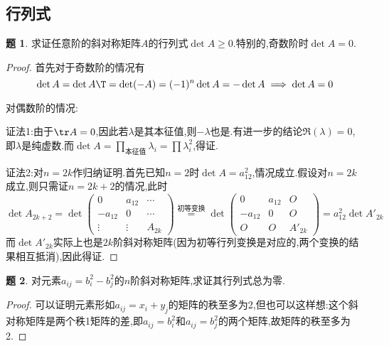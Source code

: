 \documentclass{article}
\theoremstyle{definition}
\newtheorem{exercise}{题}[section]
\begin{document}
\subsection{行列式}
\begin{exercise}
    求证任意阶的斜对称矩阵$A$的行列式$\det A\geq 0$.特别的,奇数阶时$\det A=0$.
\end{exercise}
\begin{proof}
    首先对于奇数阶的情况有$$\det A=\det A\T=\det(-A)=(-1)^n \det A=-\det A\implies \det A=0$$

    对偶数阶的情况:

    证法1:由于$\tr A=0$,因此若$\lambda$是其本征值,则$-\lambda$也是.有进一步的结论$\Re(\lambda)=0$,即$\lambda$是纯虚数.而$\det A=\prod_{\text{本征值}}\lambda_i=\prod \lambda_i^2$,得证.

    证法2:对$n=2k$作归纳证明.首先已知$n=2$时$\det A=a_{12}^2$,情况成立.假设对$n=2k$成立,则只需证$n=2k+2$的情况,此时
    $$\det A_{2k+2}=\det \begin{pmatrix}
        0&a_{12}&\cdots\\ -a_{12}&0&\cdots\\\vdots&\vdots& A_{2k}
    \end{pmatrix}\stackrel{\text{初等变换}}{=}\det \begin{pmatrix}
        0&a_{12}&O\\ -a_{12}&0&O\\O&O& A'_{2k}
    \end{pmatrix}=a_{12}^2\det A'_{2k}$$
    而$\det A'_{2k}$实际上也是$2k$阶斜对称矩阵(因为初等行列变换是对应的,两个变换的结果相互抵消),因此得证.
\end{proof}

\begin{exercise}
    对元素$a_{ij}=b^2_i-b^2_j$的$n$阶斜对称矩阵,求证其行列式总为零.
\end{exercise}
\begin{proof}
    可以证明元素形如$a_{ij}=x_i+y_j$的矩阵的秩至多为2,但也可以这样想:这个斜对称矩阵是两个秩1矩阵的差,即$a_{ij}=b^2_i$和$a_{ij}=b^2_j$的两个矩阵,故矩阵的秩至多为2.
\end{proof}
\end{document}
